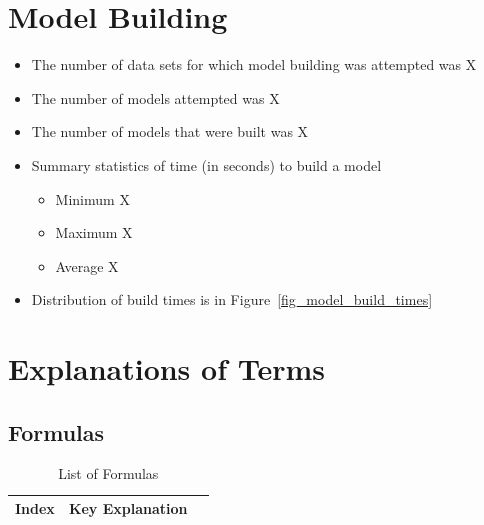 \documentclass[letterpaper,12pt]{article}
\newcommand{\bi}{\begin{itemize}}
\newcommand{\ei}{\end{itemize}}
\newcommand{\NumDataSetsForModel}{X}
\newcommand{\NumModelsAttempted}{X}
\newcommand{\NumModelsSucceeded}{X}
\newcommand{\ModelMinTime}{X}
\newcommand{\ModelMaxTime}{X}
\newcommand{\ModelAvgTime}{X}
\begin{document}
\section{Model Building}
\bi
\item The number of data sets for which model building was attempted was
  \NumDataSetsForModel
\item The number of models attempted was \NumModelsAttempted
\item The number of models that were built was \NumModelsSucceeded
\item Summary statistics of time (in seconds) to build a model
  \bi
\item Minimum \ModelMinTime
\item Maximum \ModelMaxTime
\item Average \ModelAvgTime
\ei
\item Distribution of build times is in Figure~\ref{fig_model_build_times}
\ei
\begin{figure}
\end{figure}

\section{Explanations of Terms}
\subsection{Formulas}

\begin{table}
  \centering
  \begin{tabular}{|l|l|l|} \hline \hline
    {\bf Index} & {\bf Key} {\bf Explanation} \\ \hline 
     
    \hline
  \end{tabular}
  \caption{List of Formulas}
  \label{tbl_formulas}
\end{table}
\end{document}
